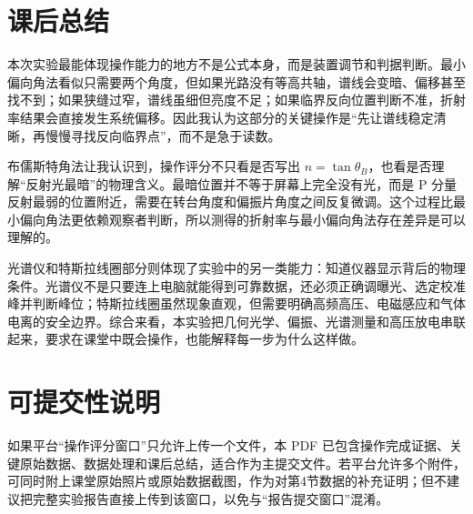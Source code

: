 \documentclass[UTF8,12pt,a4paper]{ctexart}
\begin{document}
\section{课后总结}

本次实验最能体现操作能力的地方不是公式本身，而是装置调节和判据判断。最小偏向角法看似只需要两个角度，但如果光路没有等高共轴，谱线会变暗、偏移甚至找不到；如果狭缝过窄，谱线虽细但亮度不足；如果临界反向位置判断不准，折射率结果会直接发生系统偏移。因此我认为这部分的关键操作是“先让谱线稳定清晰，再慢慢寻找反向临界点”，而不是急于读数。

布儒斯特角法让我认识到，操作评分不只看是否写出 \(n=\tan\theta_B\)，也看是否理解“反射光最暗”的物理含义。最暗位置并不等于屏幕上完全没有光，而是 P 分量反射最弱的位置附近，需要在转台角度和偏振片角度之间反复微调。这个过程比最小偏向角法更依赖观察者判断，所以测得的折射率与最小偏向角法存在差异是可以理解的。

光谱仪和特斯拉线圈部分则体现了实验中的另一类能力：知道仪器显示背后的物理条件。光谱仪不是只要连上电脑就能得到可靠数据，还必须正确调曝光、选定校准峰并判断峰位；特斯拉线圈虽然现象直观，但需要明确高频高压、电磁感应和气体电离的安全边界。综合来看，本实验把几何光学、偏振、光谱测量和高压放电串联起来，要求在课堂中既会操作，也能解释每一步为什么这样做。

\section{可提交性说明}

如果平台“操作评分窗口”只允许上传一个文件，本 PDF 已包含操作完成证据、关键原始数据、数据处理和课后总结，适合作为主提交文件。若平台允许多个附件，可同时附上课堂原始照片或原始数据截图，作为对第4节数据的补充证明；但不建议把完整实验报告直接上传到该窗口，以免与“报告提交窗口”混淆。
\end{document}
